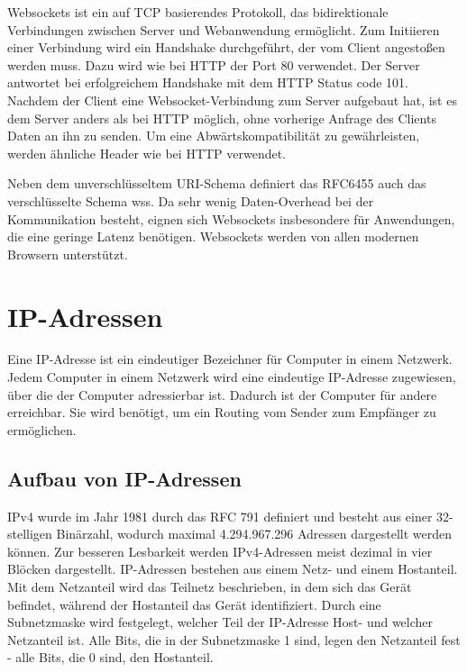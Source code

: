 Websockets ist ein auf TCP basierendes Protokoll, das bidirektionale Verbindungen zwischen Server und Webanwendung ermöglicht.\cite{rfcWebsockets} Zum Initiieren einer Verbindung wird ein Handshake durchgeführt, der vom Client angestoßen werden muss. Dazu wird wie bei HTTP der Port 80 verwendet. Der Server antwortet bei erfolgreichem Handshake mit dem HTTP Status code 101. Nachdem der Client eine Websocket-Verbindung zum Server aufgebaut hat, ist es dem Server anders als bei HTTP möglich, ohne vorherige Anfrage des Clients Daten an ihn zu senden. Um eine Abwärtskompatibilität zu gewährleisten, werden ähnliche Header wie bei HTTP verwendet.

Neben dem unverschlüsseltem URI-Schema definiert das RFC6455\cite{rfcWebsockets} auch das verschlüsselte Schema wss. Da sehr wenig Daten-Overhead bei der Kommunikation besteht, eignen sich Websockets insbesondere für Anwendungen, die eine geringe Latenz benötigen. Websockets werden von allen modernen Browsern unterstützt.

%
%
%
% 
%  

\section{IP-Adressen}
Eine IP-Adresse ist ein eindeutiger Bezeichner für Computer in einem Netzwerk. Jedem Computer in einem Netzwerk wird eine eindeutige IP-Adresse zugewiesen, über die der Computer adressierbar ist. Dadurch ist der Computer für andere erreichbar. Sie wird benötigt, um ein Routing vom Sender zum Empfänger zu ermöglichen. \cite{www}
\subsection{Aufbau von IP-Adressen}
IPv4 wurde im Jahr 1981 durch das RFC 791\cite{rfc791} definiert und besteht aus einer 32-stelligen Binärzahl, wodurch maximal 4.294.967.296 Adressen dargestellt werden können. Zur besseren Lesbarkeit werden IPv4-Adressen meist dezimal in vier Blöcken dargestellt. IP-Adressen bestehen aus einem Netz- und einem Hostanteil. Mit dem Netzanteil wird das Teilnetz beschrieben, in dem sich das Gerät befindet, während der Hostanteil das Gerät identifiziert. Durch eine Subnetzmaske wird festgelegt, welcher Teil der IP-Adresse Host- und welcher Netzanteil ist. Alle Bits, die in der Subnetzmaske 1 sind, legen den Netzanteil fest - alle Bits, die 0 sind, den Hostanteil.

